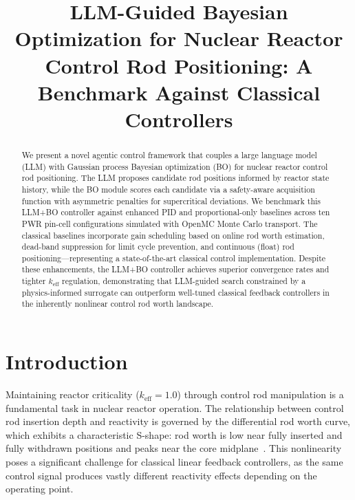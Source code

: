 \documentclass[11pt,twocolumn]{article}
\title{LLM-Guided Bayesian Optimization for Nuclear Reactor Control Rod Positioning: A Benchmark Against Classical Controllers}
\author{
}
\date{}
\begin{document}
\maketitle

\begin{abstract}
We present a novel agentic control framework that couples a large language model (LLM) with Gaussian process Bayesian optimization (BO) for nuclear reactor control rod positioning.
The LLM proposes candidate rod positions informed by reactor state history, while the BO module scores each candidate via a safety-aware acquisition function with asymmetric penalties for supercritical deviations.
We benchmark this LLM+BO controller against enhanced PID and proportional-only baselines across ten PWR pin-cell configurations simulated with OpenMC Monte Carlo transport.
The classical baselines incorporate gain scheduling based on online rod worth estimation, dead-band suppression for limit cycle prevention, and continuous (float) rod positioning---representing a state-of-the-art classical control implementation.
Despite these enhancements, the LLM+BO controller achieves superior convergence rates and tighter $k_\text{eff}$ regulation, demonstrating that LLM-guided search constrained by a physics-informed surrogate can outperform well-tuned classical feedback controllers in the inherently nonlinear control rod worth landscape.
\end{abstract}

\section{Introduction}
\label{sec:introduction}

Maintaining reactor criticality ($k_\text{eff} = 1.0$) through control rod manipulation is a fundamental task in nuclear reactor operation.
The relationship between control rod insertion depth and reactivity is governed by the differential rod worth curve, which exhibits a characteristic S-shape: rod worth is low near fully inserted and fully withdrawn positions and peaks near the core midplane~\cite{duderstadt1976nuclear,glasstone2012nuclear}.
This nonlinearity poses a significant challenge for classical linear feedback controllers, as the same control signal produces vastly different reactivity effects depending on the operating point.
\end{document}
